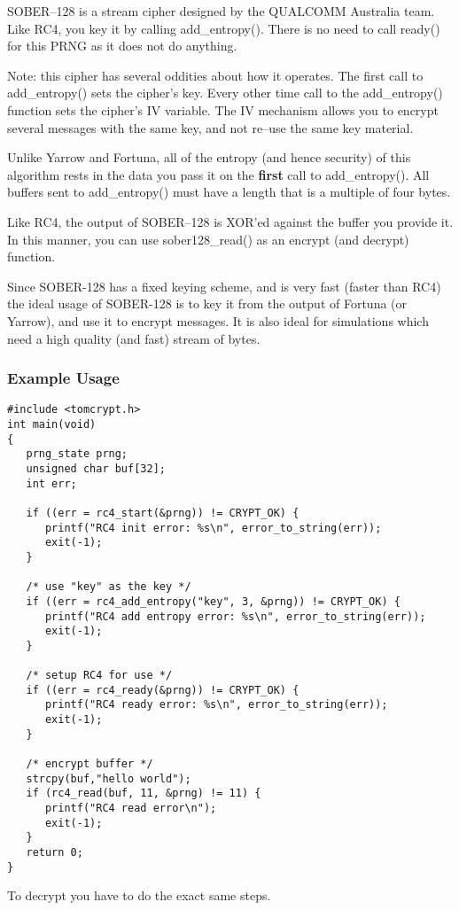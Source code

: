 \documentclass[synpaper]{book}
\begin{document}
SOBER--128 is a stream cipher designed by the QUALCOMM Australia team.  Like RC4, you key it by 
calling add\_entropy().  There is no need to call ready() for this PRNG as it does not do anything.  

Note: this cipher has several oddities about how it operates.  The first call to add\_entropy() sets the cipher's key.  
Every other time call to the add\_entropy() function sets the cipher's IV variable.  The IV mechanism allows you to 
encrypt several messages with the same key, and not re--use the same key material.

Unlike Yarrow and Fortuna, all of the entropy (and hence security) of this algorithm rests in the data
you pass it on the \textbf{first} call to add\_entropy().  All buffers sent to add\_entropy() must have a length
that is a multiple of four bytes.

Like RC4, the output of SOBER--128 is XOR'ed against the buffer you provide it.  In this manner, you can use
sober128\_read() as an encrypt (and decrypt) function.

Since SOBER-128 has a fixed keying scheme, and is very fast (faster than RC4) the ideal usage of SOBER-128 is to 
key it from the output of Fortuna (or Yarrow), and use it to encrypt messages.  It is also ideal for
simulations which need a high quality (and fast) stream of bytes.  

\subsubsection{Example Usage}
\begin{small}
\begin{verbatim}
#include <tomcrypt.h>
int main(void)
{
   prng_state prng;
   unsigned char buf[32];
   int err;

   if ((err = rc4_start(&prng)) != CRYPT_OK) {
      printf("RC4 init error: %s\n", error_to_string(err));
      exit(-1);
   }

   /* use "key" as the key */
   if ((err = rc4_add_entropy("key", 3, &prng)) != CRYPT_OK) {
      printf("RC4 add entropy error: %s\n", error_to_string(err));
      exit(-1);
   }

   /* setup RC4 for use */
   if ((err = rc4_ready(&prng)) != CRYPT_OK) {
      printf("RC4 ready error: %s\n", error_to_string(err));
      exit(-1);
   }

   /* encrypt buffer */
   strcpy(buf,"hello world");
   if (rc4_read(buf, 11, &prng) != 11) {
      printf("RC4 read error\n");
      exit(-1);
   }
   return 0;
}   
\end{verbatim}
\end{small}
To decrypt you have to do the exact same steps.  
\end{document}
